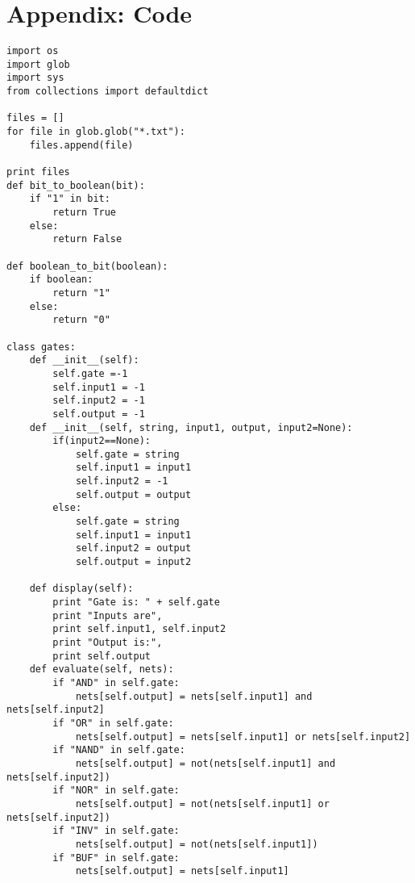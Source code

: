 \documentclass[paper=a4, fontsize=12pt]{scrartcl} %
\numberwithin{equation}{section} %
\numberwithin{figure}{section} %
\numberwithin{table}{section} %
\begin{document}
\section{Appendix: Code}
\lstset {language=Python}
\begin{lstlisting}
import os 
import glob 
import sys 
from collections import defaultdict

files = []
for file in glob.glob("*.txt"):
	files.append(file)

print files
def bit_to_boolean(bit):
	if "1" in bit:
		return True
	else:
		return False

def boolean_to_bit(boolean):
	if boolean:
		return "1"
	else:
		return "0"

class gates:
	def __init__(self):
		self.gate =-1
		self.input1 = -1
		self.input2 = -1
		self.output = -1
	def __init__(self, string, input1, output, input2=None):
		if(input2==None):
			self.gate = string
			self.input1 = input1
			self.input2 = -1
			self.output = output
		else:
			self.gate = string
			self.input1 = input1
			self.input2 = output
			self.output = input2

	def display(self):
		print "Gate is: " + self.gate
		print "Inputs are",
		print self.input1, self.input2
		print "Output is:",
		print self.output
	def evaluate(self, nets):
		if "AND" in self.gate:
			nets[self.output] = nets[self.input1] and nets[self.input2]
		if "OR" in self.gate:
			nets[self.output] = nets[self.input1] or nets[self.input2]
		if "NAND" in self.gate:
			nets[self.output] = not(nets[self.input1] and nets[self.input2])
		if "NOR" in self.gate:
			nets[self.output] = not(nets[self.input1] or nets[self.input2])
		if "INV" in self.gate:
			nets[self.output] = not(nets[self.input1])
		if "BUF" in self.gate:
			nets[self.output] = nets[self.input1]


\end{lstlisting}
\end{document}
